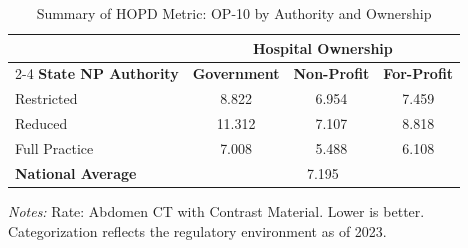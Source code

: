 \begin{table}[htbp]
    \centering
    \caption{Summary of HOPD Metric: OP-10 by Authority and Ownership}
    \label{tab:hopd_op_10_own}
    \vspace{0.2cm}
    \begin{tabular}{lccc}
        \toprule
        & \multicolumn{3}{c}{\textbf{Hospital Ownership}} \\
        \cmidrule(lr){2-4}
        \textbf{State NP Authority} & \textbf{Government} & \textbf{Non-Profit} & \textbf{For-Profit} \\
        \midrule
        Restricted & 8.822 & 6.954 & 7.459 \\
        Reduced & 11.312 & 7.107 & 8.818 \\
        Full Practice & 7.008 & 5.488 & 6.108 \\
        \midrule
        \textbf{National Average} & \multicolumn{3}{c}{7.195} \\
        \bottomrule
    \end{tabular}
    \vspace{0.1cm}
    \begin{minipage}{0.85\textwidth}
        \footnotesize \textit{Notes:} Rate: Abdomen CT with Contrast Material. Lower is better. Categorization reflects the regulatory environment as of 2023.
    \end{minipage}
\end{table}
